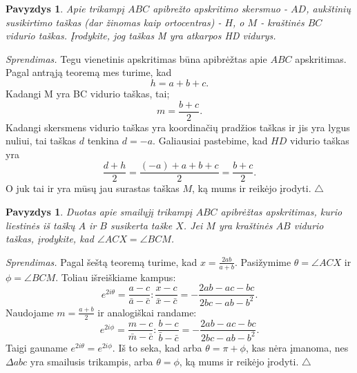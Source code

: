\documentclass[11pt,a4paper,twoside]{book}
\newenvironment{sprendimas}{\noindent \textit{Sprendimas.}}{\hfill $\triangle$}
\newcounter{foo}[subsection]
\newtheorem{pavnr}[foo]{Pavyzdys}
\theoremstyle{definition} \newtheorem*{api}{Apibrėžimas}
\theoremstyle{remark} \newtheorem*{pastaba}{Pastaba}
\begin{document}
\begin{pavnr}

Apie trikampį $ABC$ apibrežto apskritimo skersmuo - $AD$, aukštinių susikirtimo
taškas (dar žinomas kaip ortocentras) - $H$, o $M$ - kraštinės $BC$ vidurio taškas. Įrodykite, jog taškas M yra atkarpos HD vidurys.
\end{pavnr}
\begin{sprendimas}
 Tegu vienetinis apskritimas būna apibrėžtas apie $ABC$ apskritimas. Pagal antrąją teoremą mes turime, kad $$ h = a+b+c.$$ Kadangi M yra BC vidurio taškas, tai; $$m= \frac{b+c}{2}.$$   Kadangi skersmens vidurio taškas yra koordinačių pradžios taškas ir jis yra lygus nuliui, tai taškas $d$  tenkina $d= -a.$ Galiausiai pastebime, kad $HD$ vidurio taškas yra $$ \frac{d+h}{2} = \frac {(-a)+a+b+c}{2}= \frac{b+c}{2}.$$ O juk tai ir yra mūsų jau surastas taškas $M$, ką mums ir reikėjo įrodyti.
\end{sprendimas}






\begin{pavnr} 
Duotas apie smailųjį trikampį $ABC$ apibrėžtas apskritimas, kurio liestinės iš taškų $A$ ir $B$ susikerta taške $X$. Jei $M$ yra kraštinės $AB$ vidurio taškas, įrodykite, kad $\angle ACX = \angle BCM$.
\end{pavnr}
\begin{sprendimas}
Pagal šeštą teoremą turime, kad $ x= \frac {2ab}{a+b}$. Pasižymime $\theta = \angle ACX$ ir $\phi = \angle BCM$. Toliau išreiškiame kampus:
$$ e^{ 2i\theta} = \frac { a-c}{ \bar a - \bar c} : \frac {x-c}{\bar x - \bar c}=
- \frac { 2ab -ac-bc}{2bc - ab- b^2}.$$
Naudojame $m = \frac {a+b}{2}$ ir analogiškai randame:
$$ e^{2i\phi} = \frac { m-c}{ \bar m - \bar c} : \frac {b-c}{\bar b - \bar c}=
- \frac { 2ab -ac-bc}{2bc - ab- b^2}.$$
Taigi gauname $ e^{ 2i\theta} = e^{2i\phi}$. Iš to seka, kad arba $ \theta = \pi + \phi$, kas nėra įmanoma, nes $\Delta abc$ yra smailusis trikampis, arba $\theta =\phi$, ką mums ir reikėjo įrodyti.
\end{sprendimas}
\end{document}
